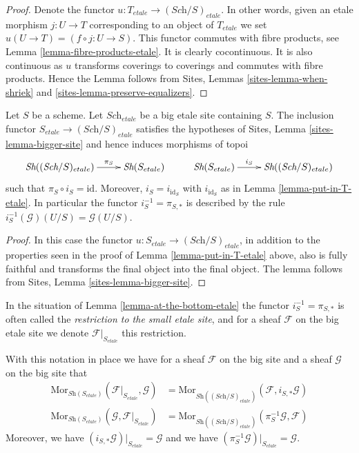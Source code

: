 \begin{proof}
Denote the functor $u : T_{etale} \to (\textit{Sch}/S)_{etale}$.
In other words, given an etale morphism $j : U \to T$ corresponding
to an object of $T_{etale}$ we set $u(U \to T) = (f \circ j : U \to S)$.
This functor commutes with fibre products, see
Lemma \ref{lemma-fibre-products-etale}.
It is clearly cocontinuous.
It is also continuous as $u$ transforms coverings to coverings and
commutes with fibre products. Hence the Lemma follows from
Sites, Lemmas \ref{sites-lemma-when-shriek}
and \ref{sites-lemma-preserve-equalizers}.
\end{proof}

\begin{lemma}
\label{lemma-at-the-bottom-etale}
Let $S$ be a scheme. Let $\textit{Sch}_{etale}$ be a big etale
site containing $S$.
The inclusion functor $S_{etale} \to (\textit{Sch}/S)_{etale}$
satisfies the hypotheses of Sites, Lemma \ref{sites-lemma-bigger-site}
and hence induces morphisms of topoi
$$
\xymatrix{
\textit{Sh}((\textit{Sch}/S)_{etale}) \ar[r]^-{\pi_S} &
\textit{Sh}(S_{etale}) &
\textit{Sh}(S_{etale}) \ar[r]^-{i_S} &
\textit{Sh}((\textit{Sch}/S)_{etale})
}
$$
such that $\pi_S \circ i_S = \text{id}$. Moreover, $i_S = i_{\text{id}_S}$
with $i_{\text{id}_S}$ as in Lemma \ref{lemma-put-in-T-etale}.
In particular the functor $i_S^{-1} = \pi_{S, *}$ is described by the rule
$i_S^{-1}(\mathcal{G})(U/S) = \mathcal{G}(U/S)$.
\end{lemma}

\begin{proof}
In this case the functor $u : S_{etale} \to (\textit{Sch}/S)_{etale}$,
in addition to the properties seen in the proof of
Lemma \ref{lemma-put-in-T-etale} above, also is fully faithful
and transforms the final object into the final object.
The lemma follows from Sites, Lemma \ref{sites-lemma-bigger-site}.
\end{proof}

\begin{definition}
\label{definition-restriction-small-etale}
In the situation of
Lemma \ref{lemma-at-the-bottom-etale}
the functor $i_S^{-1} = \pi_{S, *}$ is often
called the {\it restriction to the small etale site}, and for a sheaf
$\mathcal{F}$ on the big etale site we denote $\mathcal{F}|_{S_{etale}}$
this restriction.
\end{definition}

\noindent
With this notation in place we have for a sheaf $\mathcal{F}$ on the
big site and a sheaf $\mathcal{G}$ on the big site that
\begin{align*}
\text{Mor}_{\textit{Sh}(S_{etale})}(\mathcal{F}|_{S_{etale}}, \mathcal{G})
& =
\text{Mor}_{\textit{Sh}((\textit{Sch}/S)_{etale})}(\mathcal{F},
i_{S,*}\mathcal{G}) \\
\text{Mor}_{\textit{Sh}(S_{etale})}(\mathcal{G}, \mathcal{F}|_{S_{etale}})
& =
\text{Mor}_{\textit{Sh}((\textit{Sch}/S)_{etale})}(\pi_S^{-1}\mathcal{G},
\mathcal{F})
\end{align*}
Moreover, we have $(i_{S,*}\mathcal{G})|_{S_{etale}} = \mathcal{G}$
and we have $(\pi_S^{-1}\mathcal{G})|_{S_{etale}} = \mathcal{G}$.

